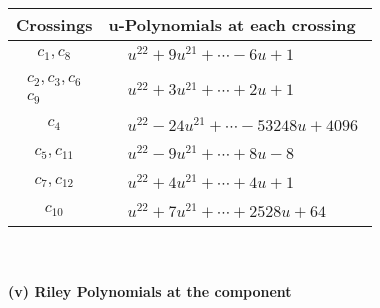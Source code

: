 \documentclass[1p]{elsarticle_modified}
\theoremstyle{definition}
\begin{document}
\begin{tabular}{m{50pt}|m{274pt}}
Crossings & \hspace{64pt}u-Polynomials at each crossing \\
\hline $$\begin{aligned}c_{1},c_{8}\end{aligned}$$&$\begin{aligned}
&u^{22}+9 u^{21}+\cdots-6 u+1
\end{aligned}$\\
\hline $$\begin{aligned}c_{2},c_{3},c_{6}\\c_{9}\end{aligned}$$&$\begin{aligned}
&u^{22}+3 u^{21}+\cdots+2 u+1
\end{aligned}$\\
\hline $$\begin{aligned}c_{4}\end{aligned}$$&$\begin{aligned}
&u^{22}-24 u^{21}+\cdots-53248 u+4096
\end{aligned}$\\
\hline $$\begin{aligned}c_{5},c_{11}\end{aligned}$$&$\begin{aligned}
&u^{22}-9 u^{21}+\cdots+8 u-8
\end{aligned}$\\
\hline $$\begin{aligned}c_{7},c_{12}\end{aligned}$$&$\begin{aligned}
&u^{22}+4 u^{21}+\cdots+4 u+1
\end{aligned}$\\
\hline $$\begin{aligned}c_{10}\end{aligned}$$&$\begin{aligned}
&u^{22}+7 u^{21}+\cdots+2528 u+64
\end{aligned}$\\
\hline
\end{tabular}\\~\\
\newpage\renewcommand{\arraystretch}{1}
\flushleft \textbf{(v) Riley Polynomials at the component}\newline \\
\end{document}
